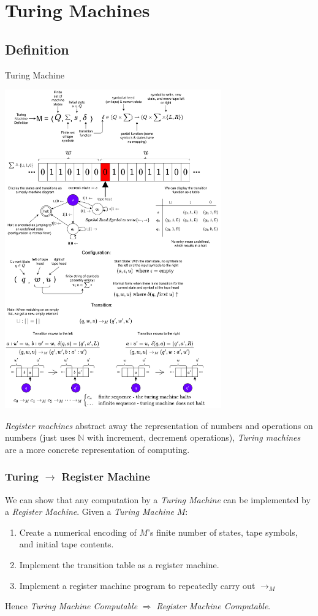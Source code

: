 \chapter{Turing Machines}

\section{Definition}
\begin{definitionbox}{Turing Machine}
    \begin{center}
        \includegraphics[width=0.7\textwidth]{turing_machines/images/turing_machine.drawio.png}
    \end{center}
\end{definitionbox}

\textit{Register machines} abstract away the representation of numbers and operations on numbers (just uses $\mathbb{N}$ with increment, decrement operations), \textit{Turing machines} are a more concrete representation of computing.

\subsection{Turing $\to$ Register Machine}
We can show that any computation by a \textit{Turing Machine} can be implemented by a \textit{Register Machine}. Given a \textit{Turing Machine} $M$:
\begin{enumerate}
	\item Create a numerical encoding of $M$'s finite number of states, tape symbols, and initial tape contents.
	\item Implement the transition table as a register machine.
	\item Implement a register machine program to repeatedly carry out $\to_M$
\end{enumerate}
Hence \textit{Turing Machine Computable} $\Rightarrow$ \textit{Register Machine Computable}.

